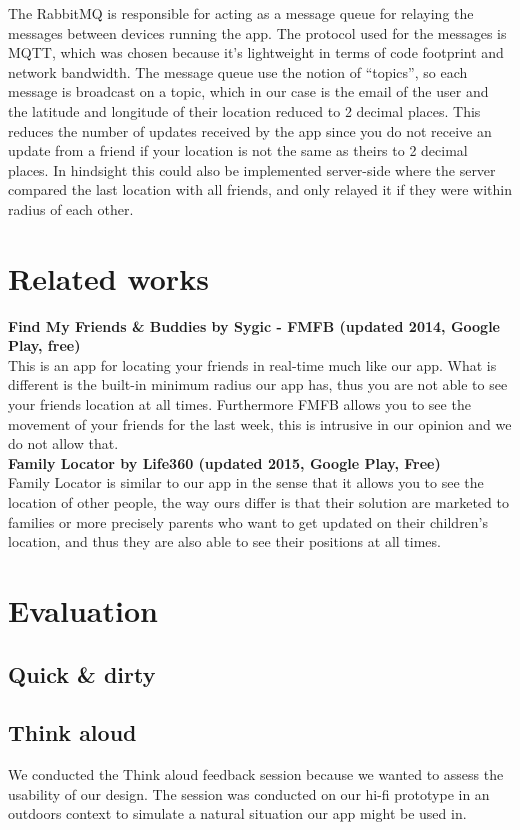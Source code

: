 \documentclass[runningheads,a4paper]{llncs}
\begin{document}
The RabbitMQ is responsible for acting as a message queue for relaying the messages between devices running the app. The protocol used for the messages is MQTT, which was chosen because it’s lightweight in terms of code footprint and network bandwidth. The message queue use the notion of “topics”, so each message is broadcast on a topic, which in our case is the email of the user and the latitude and longitude of their location reduced to 2 decimal places. This reduces the number of updates received by the app since you do not receive an update from a friend if your location is not the same as theirs to 2 decimal places. In hindsight this could also be implemented server-side where the server compared the last location with all friends, and only relayed it if they were within radius of each other.

 
\section{Related works}
\textbf{Find My Friends \& Buddies by Sygic - FMFB (updated 2014, Google Play, free)}\\
This is an app for locating your friends in real-time much like our app. What is different is the built-in minimum radius our app has, thus you are not able to see your friends location at all times. Furthermore FMFB allows you to see the movement of your friends for the last week, this is intrusive in our opinion and we do not allow that.\\

\textbf{Family Locator by Life360 (updated 2015, Google Play, Free)}\\
Family Locator is similar to our app in the sense that it allows you to see the location of other people, the way ours differ is that their solution are marketed to families or more precisely parents who want to get updated on their children's location, and thus they are also able to see their positions at all times. 


\section{Evaluation}
\subsection*{Quick \& dirty}

\subsection*{Think aloud}
We conducted the Think aloud feedback session because we wanted to assess the usability of our design. The session was conducted on our hi-fi prototype in an outdoors context to simulate a natural situation our app might be used in.\\
\end{document}
